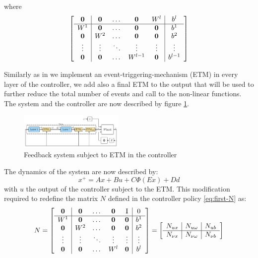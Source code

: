 \documentclass{article}
\begin{document}
where
\begin{equation}\label{eq:first-N}
  \left[\begin{matrix}
    \begin{array}{c | c c c c | c}
      \operatorname{\mathbf{0}} & \operatorname{\mathbf{0}} & \dots & \operatorname{\mathbf{0}} & W^l & b^l \\ 
      \hline
      W^1 & \operatorname{\mathbf{0}} & \dots & \operatorname{\mathbf{0}} & \operatorname{\mathbf{0}} & b^1 \\
      \operatorname{\mathbf{0}} & W^2 & \dots & \operatorname{\mathbf{0}} & \operatorname{\mathbf{0}} & b^2 \\
      \vdots & \vdots & \ddots & \vdots & \vdots & \vdots \\
      \operatorname{\mathbf{0}} & \operatorname{\mathbf{0}} & \dots & W^{l-1} & \operatorname{\mathbf{0}} & b^{l-1}
    \end{array}
  \end{matrix}\right]
\end{equation}

Similarly as in \cite{css-extended} we implement an event-triggering-mechanism (ETM) in every layer of the controller, we add also a final ETM to the output that will be used to further reduce the total number of events and call to the non-linear functions. The system and the controller are now described by figure \ref{fig:second_scheme}.

\begin{figure}[H]
    \centering
    \includegraphics[width=0.45\textwidth]{img/second_scheme}
    \caption{Feedback system subject to ETM in the controller}
    \label{fig:second_scheme}
\end{figure}

The dynamics of the system are now described by:
\begin{equation}\label{eq:system-dynamics}
  x^{+} = A x + B u + C \Phi(E x) + D d
\end{equation}
with $u$ the output of the controller subject to the ETM. This modification required to redefine the matrix $N$ defined in the controller policy \ref{eq:first-N} as:
\begin{equation}\label{eq:last-N}
  N = \left[\begin{matrix}
    \begin{array}{c | c c c c | c}
      \operatorname{\mathbf{0}} & \operatorname{\mathbf{0}} & \dots & \operatorname{\mathbf{0}} & \operatorname{I} & 0 \\ 
      \hline
      W^1 & \operatorname{\mathbf{0}} & \dots & \operatorname{\mathbf{0}} & \operatorname{\mathbf{0}} & b^1 \\
      \operatorname{\mathbf{0}} & W^2 & \dots & \operatorname{\mathbf{0}} & \operatorname{\mathbf{0}} & b^2 \\
      \vdots & \vdots & \ddots & \vdots & \vdots & \vdots \\
      \operatorname{\mathbf{0}} & \operatorname{\mathbf{0}} & \dots & W^l & \operatorname{\mathbf{0}} & b^l
    \end{array}
  \end{matrix}\right] = \left[\begin{matrix}
    \begin{array}{c | c | c}
    N_{u x} & N_{u \omega} & N_{u b} \\
    \hline
    N_{\nu x} & N_{\nu \omega} & N_{\nu b}
    \end{array} 
  \end{matrix}\right]
\end{equation}
\end{document}

